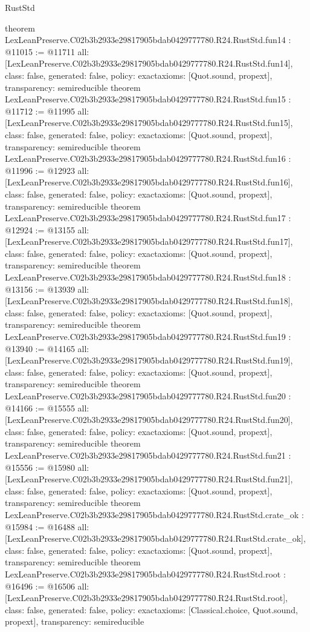 \begin{lexlean}{RustStd}
\begin{coremodule}
{}
theorem LexLeanPreserve.C02b3b2933e29817905bdab0429777780.R24.RustStd.fun14 : @11015 := @11711 {
  all: [LexLeanPreserve.C02b3b2933e29817905bdab0429777780.R24.RustStd.fun14],
  class: false,
  generated: false,
  policy: exact{axioms: [Quot.sound, propext]},
  transparency: semireducible
}
theorem LexLeanPreserve.C02b3b2933e29817905bdab0429777780.R24.RustStd.fun15 : @11712 := @11995 {
  all: [LexLeanPreserve.C02b3b2933e29817905bdab0429777780.R24.RustStd.fun15],
  class: false,
  generated: false,
  policy: exact{axioms: [Quot.sound, propext]},
  transparency: semireducible
}
theorem LexLeanPreserve.C02b3b2933e29817905bdab0429777780.R24.RustStd.fun16 : @11996 := @12923 {
  all: [LexLeanPreserve.C02b3b2933e29817905bdab0429777780.R24.RustStd.fun16],
  class: false,
  generated: false,
  policy: exact{axioms: [Quot.sound, propext]},
  transparency: semireducible
}
theorem LexLeanPreserve.C02b3b2933e29817905bdab0429777780.R24.RustStd.fun17 : @12924 := @13155 {
  all: [LexLeanPreserve.C02b3b2933e29817905bdab0429777780.R24.RustStd.fun17],
  class: false,
  generated: false,
  policy: exact{axioms: [Quot.sound, propext]},
  transparency: semireducible
}
theorem LexLeanPreserve.C02b3b2933e29817905bdab0429777780.R24.RustStd.fun18 : @13156 := @13939 {
  all: [LexLeanPreserve.C02b3b2933e29817905bdab0429777780.R24.RustStd.fun18],
  class: false,
  generated: false,
  policy: exact{axioms: [Quot.sound, propext]},
  transparency: semireducible
}
theorem LexLeanPreserve.C02b3b2933e29817905bdab0429777780.R24.RustStd.fun19 : @13940 := @14165 {
  all: [LexLeanPreserve.C02b3b2933e29817905bdab0429777780.R24.RustStd.fun19],
  class: false,
  generated: false,
  policy: exact{axioms: [Quot.sound, propext]},
  transparency: semireducible
}
theorem LexLeanPreserve.C02b3b2933e29817905bdab0429777780.R24.RustStd.fun20 : @14166 := @15555 {
  all: [LexLeanPreserve.C02b3b2933e29817905bdab0429777780.R24.RustStd.fun20],
  class: false,
  generated: false,
  policy: exact{axioms: [Quot.sound, propext]},
  transparency: semireducible
}
theorem LexLeanPreserve.C02b3b2933e29817905bdab0429777780.R24.RustStd.fun21 : @15556 := @15980 {
  all: [LexLeanPreserve.C02b3b2933e29817905bdab0429777780.R24.RustStd.fun21],
  class: false,
  generated: false,
  policy: exact{axioms: [Quot.sound, propext]},
  transparency: semireducible
}
theorem LexLeanPreserve.C02b3b2933e29817905bdab0429777780.R24.RustStd.crate_ok : @15984 := @16488 {
  all: [LexLeanPreserve.C02b3b2933e29817905bdab0429777780.R24.RustStd.crate_ok],
  class: false,
  generated: false,
  policy: exact{axioms: [Quot.sound, propext]},
  transparency: semireducible
}
theorem LexLeanPreserve.C02b3b2933e29817905bdab0429777780.R24.RustStd.root : @16496 := @16506 {
  all: [LexLeanPreserve.C02b3b2933e29817905bdab0429777780.R24.RustStd.root],
  class: false,
  generated: false,
  policy: exact{axioms: [Classical.choice, Quot.sound, propext]},
  transparency: semireducible
}


\end{coremodule}
\end{lexlean}
